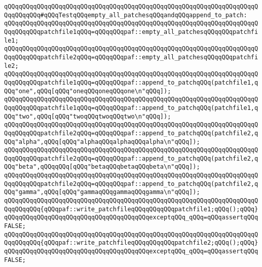 \verb|qQQqqQQqqQQqqQQqqQQqqQQqqQQqqQQqqQQqqQQqqQQqqQQqqQQqqQQqqQQqqQQqqQQqqQQqqQQqqQQq#qQQqTestqQQqempty_all_patchesqQQqandqQQqappend_to_patch:|\newline
\newline
\verb|qQQqqQQqqQQqqQQqqQQqqQQqqQQqqQQqqQQqqQQqqQQqqQQqqQQqqQQqqQQqqQQqqQQqqQQqqQQqqQQqpatchfile1qQQq=qQQqqQQqpaf::empty_all_patchesqQQqqQQqpatchfile1;|\newline
\verb|qQQqqQQqqQQqqQQqqQQqqQQqqQQqqQQqqQQqqQQqqQQqqQQqqQQqqQQqqQQqqQQqqQQqqQQqqQQqqQQqpatchfile2qQQq=qQQqqQQqpaf::empty_all_patchesqQQqqQQqpatchfile2;|\newline
\newline
\verb|qQQqqQQqqQQqqQQqqQQqqQQqqQQqqQQqqQQqqQQqqQQqqQQqqQQqqQQqqQQqqQQqqQQqqQQqqQQqqQQqpatchfile1qQQq=qQQqqQQqpaf::append_to_patchqQQq(patchfile1,qQQq"one",qQQq[qQQq"oneqQQqoneqQQqone\n"qQQq]);|\newline
\verb|qQQqqQQqqQQqqQQqqQQqqQQqqQQqqQQqqQQqqQQqqQQqqQQqqQQqqQQqqQQqqQQqqQQqqQQqqQQqqQQqpatchfile1qQQq=qQQqqQQqpaf::append_to_patchqQQq(patchfile1,qQQq"two",qQQq[qQQq"twoqQQqtwoqQQqtwo\n"qQQq]);|\newline
\newline
\verb|qQQqqQQqqQQqqQQqqQQqqQQqqQQqqQQqqQQqqQQqqQQqqQQqqQQqqQQqqQQqqQQqqQQqqQQqqQQqqQQqpatchfile2qQQq=qQQqqQQqpaf::append_to_patchqQQq(patchfile2,qQQq"alpha",qQQq[qQQq"alphaqQQqalphaqQQqalpha\n"qQQq]);|\newline
\verb|qQQqqQQqqQQqqQQqqQQqqQQqqQQqqQQqqQQqqQQqqQQqqQQqqQQqqQQqqQQqqQQqqQQqqQQqqQQqqQQqpatchfile2qQQq=qQQqqQQqpaf::append_to_patchqQQq(patchfile2,qQQq"beta",qQQqqQQq[qQQq"betaqQQqbetaqQQqbeta\n"qQQq]);|\newline
\verb|qQQqqQQqqQQqqQQqqQQqqQQqqQQqqQQqqQQqqQQqqQQqqQQqqQQqqQQqqQQqqQQqqQQqqQQqqQQqqQQqpatchfile2qQQq=qQQqqQQqpaf::append_to_patchqQQq(patchfile2,qQQq"gamma",qQQq[qQQq"gammaqQQqgammaqQQqgamma\n"qQQq]);|\newline
\newline
\verb|qQQqqQQqqQQqqQQqqQQqqQQqqQQqqQQqqQQqqQQqqQQqqQQqqQQqqQQqqQQqqQQqqQQqqQQqqQQqqQQq{qQQqpaf::write_patchfileqQQqqQQqqQQqpatchfile1;qQQq();qQQq}qQQqqQQqqQQqqQQqqQQqqQQqqQQqqQQqqQQqqQQqexceptqQQq_qQQq=qQQqassertqQQqFALSE;|\newline
\verb|qQQqqQQqqQQqqQQqqQQqqQQqqQQqqQQqqQQqqQQqqQQqqQQqqQQqqQQqqQQqqQQqqQQqqQQqqQQqqQQq{qQQqpaf::write_patchfileqQQqqQQqqQQqpatchfile2;qQQq();qQQq}qQQqqQQqqQQqqQQqqQQqqQQqqQQqqQQqqQQqqQQqexceptqQQq_qQQq=qQQqassertqQQqFALSE;|\newline
\newline
